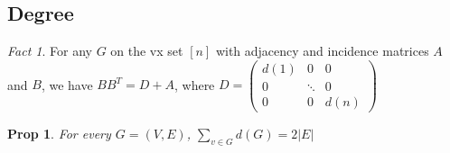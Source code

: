\documentclass[11pt, fleqn, a4paper, landscape]{article}
\theoremstyle{plain} %
\newtheorem{pro}[thm]{Prop}
\theoremstyle{remark} %
\newtheorem{rem}[thm]{Rem}
\newtheorem{nota}[thm]{Not}
\newtheorem{fact}{Fact}
\theoremstyle{definition} %
\newtheorem{defi}[thm]{Def}
\begin{document}
\begin{multicols}{5}
\addtocounter{thm}{3}

\subsection{Degree}

\addtocounter{thm}{1}
\addtocounter{thm}{1} 
\addtocounter{thm}{1}
\begin{fact}
For any $G$ on the vx set $[n]$ with adjacency and incidence matrices $A$ and $B$, we have $BB^T = D + A$, where
$D=
\begin{pmatrix}
d(1) & 0 & 0  \\
0 & \ddots & 0  \\
0 & 0 & d(n)  
\end{pmatrix}
$  
\end{fact}

\addtocounter{thm}{1}

\addtocounter{thm}{2}
\begin{pro}
For every $G = (V,E)$, $\sum_{v\in G}d(G)=2|E|$
\end{pro}


\end{multicols}
\end{document}
